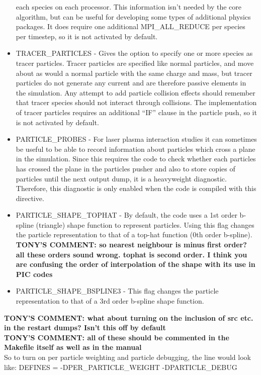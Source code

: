 \documentclass[12pt,a4paper]{article}
\newcommand{\tony}[1]{{\color{warwickred} \bf{TONY'S COMMENT:} \bf{#1}}\\}
\newenvironment{boxverbatim}{\lboxverbatim{none}}{\endlboxverbatim}
\begin{document}
\begin{itemize}
  each species on each processor. This information isn't needed by the core
  algorithm, but can be useful for developing some types of additional physics
  packages. It does require one additional MPI\_ALL\_REDUCE per species per
  timestep, so it is not activated by default.
\item TRACER\_PARTICLES - Gives the option to specify one or more species as
  tracer particles. Tracer particles are specified like normal particles, and
  move about as would a normal particle with the same charge and mass, but
  tracer particles do not generate any current and are therefore passive
  elements in the simulation. Any attempt to add particle collision effects
  should remember that tracer species should not interact through collisions.
  The implementation of tracer particles requires an additional ``IF'' clause
  in the particle push, so it is not activated by default.
\item PARTICLE\_PROBES - For laser plasma interaction studies it can sometimes
  be useful to be able to record information about particles which cross a
  plane in the simulation. Since this requires the code to check whether each
  particles has crossed the plane in the particles pusher and also to store
  copies of particles until the next output dump, it is a heavyweight
  diagnostic. Therefore, this diagnostic is only enabled when the code is
  compiled with this directive.
\item PARTICLE\_SHAPE\_TOPHAT - By default, the code uses a 1st order
  b-spline (triangle) shape function to represent particles. Using this flag
  changes the particle representation to that of a top-hat function
  (0th order b-spline).
  \tony{so nearest neighbour is minus first order? all these orders sound
   wrong. tophat is second order. I think you are confusing the order of
   interpolation of the shape with its use in PIC codes}
\item PARTICLE\_SHAPE\_BSPLINE3 - This flag changes the particle representation
  to that of a 3rd order b-spline shape function.
\end{itemize}
\tony{what about turning on the inclusion of src etc. in the restart dumps?
Isn't this off by default}
\tony{all of these should be commented in the Makefile itself as well as in
the manual}

So to turn on per particle weighting and particle debugging, the line would
look like:
\begin{boxverbatim}
DEFINES = -DPER_PARTICLE_WEIGHT -DPARTICLE_DEBUG
\end{boxverbatim}
\end{document}
